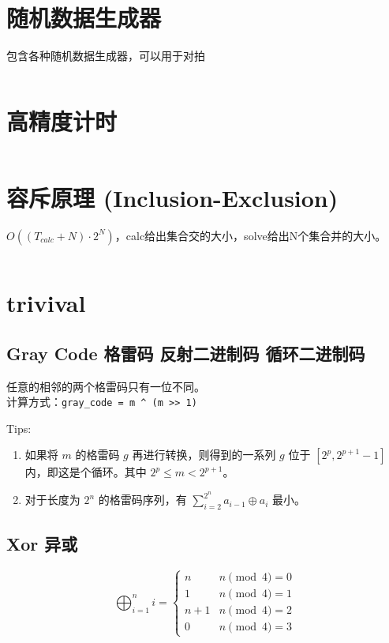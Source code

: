 \documentclass[openany,a4paper]{book}
\begin{document}
\section{随机数据生成器}
包含各种随机数据生成器，可以用于对拍
\inputminted{cpp}{Misc/DoubleChecking/genlib.hpp}
\section{高精度计时}
\inputminted{cpp}{Misc/chrono.hpp}
\section{容斥原理 (Inclusion-Exclusion)}
$O((T_{calc}+N)\cdot2^N)$，calc给出集合交的大小，solve给出N个集合并的大小。
\inputminted{cpp}{Misc/in-ex-clusion.hpp}
\section{trivival}
\subsection*{Gray Code 格雷码 反射二进制码 循环二进制码}
任意的相邻的两个格雷码只有一位不同。\\
计算方式：\verb|gray_code = m ^ (m >> 1)|

\noindent Tips:
\begin{enumerate}
    \item 如果将 $m$ 的格雷码 $g$ 再进行转换，则得到的一系列 $g$ 位于 $[2^p, 2^{p+1}-1]$ 内，即这是个循环。其中 $2^p \le m < 2^{p+1}$。
    \item 对于长度为 $2^n$ 的格雷码序列，有 $\sum_{i=2}^{2^n} a_{i-1} \oplus a_i$ 最小。
\end{enumerate}

\subsection*{Xor 异或}
\[
    \bigoplus_{i = 1}^{n} i =
    \begin{cases}
        n   & n \pmod 4 = 0 \\
        1   & n \pmod 4 = 1 \\
        n+1 & n \pmod 4 = 2 \\
        0   & n \pmod 4 = 3
    \end{cases}
\]
\end{document}

